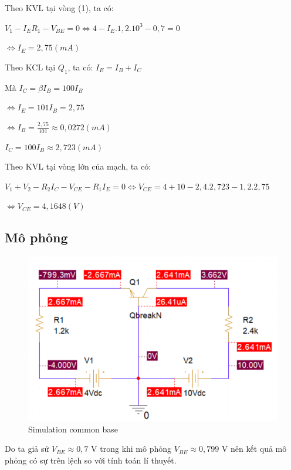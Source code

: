 Theo KVL tại vòng (1), ta có:

\(V_1 - I_{E}R_1 - V_{BE} = 0 \iff 4 - I_{E}.1,2.10^3 - 0,7 = 0\)

\(\iff I_{E} = 2,75 (mA)\)

Theo KCL tại \(Q_1\), ta có: \(I_E = I_B + I_C\)

Mà \(I_C = \beta I_B = 100I_B\)

\(\iff I_E = 101I_B = 2,75\)

\(\iff I_B = \frac{2,75}{101} \approx 0,0272 (mA)\)

\(I_C = 100I_B \approx 2,723 (mA) \)

Theo KVL tại vòng lớn của mạch, ta có:

\(V_1 + V_2 - R_2I_C - V_{CE} - R_1I_E = 0 \iff V_{CE}= 4 + 10 - 2,4.2,723 -1,2.2,75\)

\(\iff V_{CE} = 4,1648 (V)\)

\subsection{Mô phỏng}

\begin{figure}[ht]
    \centering
    \includegraphics[scale=0.33]{graphics/ex10/f3.png}
    \caption{Simulation common base}
\end{figure}

Do ta giả sử \(V_{BE} \approx 0,7 \) V trong khi mô phỏng \(V_{BE} \approx 0,799 \) V nên kết quả mô phỏng có sự trên lệch so với tính toán lí thuyết.
\pagebreak
